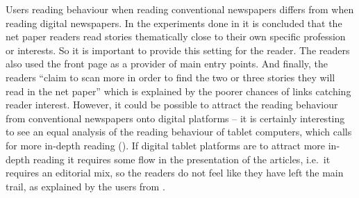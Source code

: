 Users reading behaviour when reading conventional newspapers differs from when reading digital newspapers. In the experiments done in \cite{holmqvist2003reading} it is concluded that the net paper readers read stories thematically close to their own specific profession or interests. So it is important to provide this setting for the reader. The readers also used the front page as a provider of main entry points. And finally, the readers ``claim to scan more in order to find the two or three stories they will read in the net paper'' which is explained by the poorer chances of links catching reader interest. However, it could be possible to attract the reading behaviour from conventional newspapers onto digital platforms -- it is certainly interesting to see an equal analysis of the reading behaviour of tablet computers, which calls for more in-depth reading (\cite{TabletRead}). If digital tablet platforms are to attract more in-depth reading it requires some flow in the presentation of the articles, i.e.\ it requires an editorial mix, so the readers do not feel like they have left the main trail, as explained by the users from \cite{holmqvist2003reading}.
%
%
%
\clearpage

